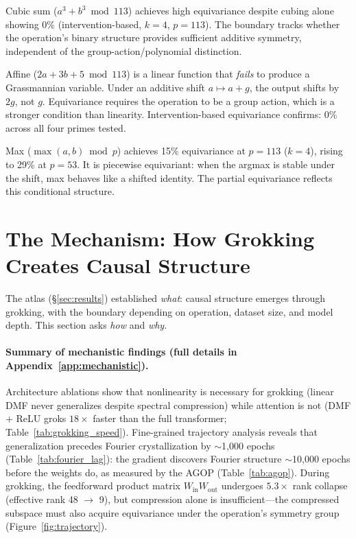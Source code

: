 \documentclass{article}
\begin{document}
Cubic sum ($a^3 + b^3 \bmod 113$) achieves high equivariance despite
cubing alone showing 0\% (intervention-based, $k{=}4$, $p{=}113$).
The boundary tracks whether the operation's binary structure provides sufficient
additive symmetry, independent of the group-action/polynomial distinction.

Affine ($2a + 3b + 5 \bmod 113$) is a linear function that \emph{fails} to
produce a Grassmannian variable. Under an additive shift $a \mapsto a + g$, the
output shifts by $2g$, not $g$. Equivariance requires the operation to be a group
action, which is a stronger condition than linearity. Intervention-based
equivariance confirms: 0\% across all four primes tested.

Max ($\max(a,b) \bmod p$) achieves 15\% equivariance at $p{=}113$ ($k{=}4$),
rising to 29\% at $p{=}53$. It is piecewise equivariant: when the argmax is
stable under the shift, max behaves like a shifted identity. The partial
equivariance reflects this conditional structure.


\section{The Mechanism: How Grokking Creates Causal Structure}
\label{sec:mechanism}

The atlas (\S\ref{sec:results}) established \emph{what}: causal structure
emerges through grokking, with the boundary depending on operation, dataset
size, and model depth. This section asks \emph{how} and \emph{why}.

\paragraph{Summary of mechanistic findings (full details in
Appendix~\ref{app:mechanistic}).}
Architecture ablations show that nonlinearity is necessary for grokking
(linear DMF never generalizes despite spectral compression) while attention
is not (DMF + ReLU groks $18\times$ faster than the full transformer;
Table~\ref{tab:grokking_speed}). Fine-grained trajectory analysis reveals
that generalization precedes Fourier crystallization by $\sim$1{,}000 epochs
(Table~\ref{tab:fourier_lag}): the gradient discovers Fourier structure
$\sim$10{,}000 epochs before the weights do, as measured by the AGOP
(Table~\ref{tab:agop}). During grokking, the feedforward product matrix
$W_\text{in} W_\text{out}$ undergoes $5.3\times$ rank collapse (effective
rank 48 $\to$ 9), but compression alone is insufficient---the compressed
subspace must also acquire equivariance under the operation's symmetry group
(Figure~\ref{fig:trajectory}).
\end{document}
